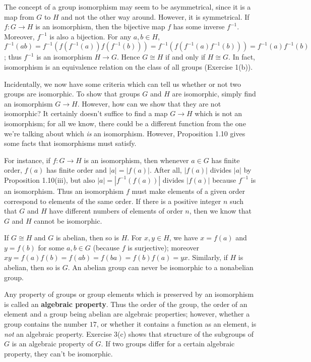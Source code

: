 \documentclass[leqno]{book}
\begin{document}
\noindent The concept of a group isomorphism may seem to be asymmetrical, since it is a map from $G$ to $H$ and not the other way around.  However, it is symmetrical.  If $f:G\to H$ is an isomorphism, then the bijective map $f$ has some inverse $f^{-1}$.  Moreover, $f^{-1}$ is also a bijection.  For any $a,b\in H$, $f^{-1}(ab)=f^{-1}(f(f^{-1}(a))f(f^{-1}(b)))=f^{-1}(f(f^{-1}(a)f^{-1}(b)))=f^{-1}(a)f^{-1}(b)$; thus $f^{-1}$ is an isomorphism $H\to G$.  Hence $G\cong H$ if and only if $H\cong G$.  In fact, isomorphism is an equivalence relation on the class of all groups (Exercise 1(b)).

Incidentally, we now have some criteria which can tell us whether or not two groups are isomorphic.  To show that groups $G$ and $H$ are isomorphic, simply find an isomorphism $G\to H$.  However, how can we show that they are not isomorphic?  It certainly doesn't suffice to find a map $G\to H$ which is not an isomorphism; for all we know, there could be a different function from the one we're talking about which \emph{is} an isomorphism.  However, Proposition 1.10 gives some facts that isomorphisms must satisfy.

For instance, if $f:G\to H$ is an isomorphism, then whenever $a\in G$ has finite order, $f(a)$ has finite order and $|a|=|f(a)|$.  After all, $|f(a)|$ divides $|a|$ by Proposition 1.10(iii), but also $|a|=|f^{-1}(f(a))|$ divides $|f(a)|$ because $f^{-1}$ is an isomorphism.  Thus an isomorphism $f$ must make elements of a given order correspond to elements of the same order.  If there is a positive integer $n$ such that $G$ and $H$ have different numbers of elements of order $n$, then we know that $G$ and $H$ cannot be isomorphic.

If $G\cong H$ and $G$ is abelian, then so is $H$.  For $x,y\in H$, we have $x=f(a)$ and $y=f(b)$ for some $a,b\in G$ (because $f$ is surjective); moreover $xy=f(a)f(b)=f(ab)=f(ba)=f(b)f(a)=yx$.  Similarly, if $H$ is abelian, then so is $G$.  An abelian group can never be isomorphic to a nonabelian group.

Any property of groups or group elements which is preserved by an isomorphism is called an \textbf{algebraic property}.  Thus the order of the group, the order of an element and a group being abelian are algebraic properties; however, whether a group contains the number $17$, or whether it contains a function as an element, is \emph{not} an algebraic property.  Exercise 3(c) shows that structure of the subgroups of $G$ is an algebraic property of $G$.  If two groups differ for a certain algebraic property, they can't be isomorphic.\\
\end{document}
